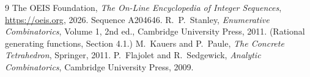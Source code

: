 \documentclass[11pt,a4paper]{article}
\theoremstyle{plain}
\theoremstyle{definition}
\begin{document}
\begin{thebibliography}{9}
 The OEIS Foundation, \emph{The On-Line Encyclopedia of Integer
Sequences}, \url{https://oeis.org}, 2026. Sequence A204646.
 R.~P.~Stanley, \emph{Enumerative Combinatorics}, Volume 1, 2nd ed.,
Cambridge University Press, 2011. (Rational generating functions, Section 4.1.)
 M.~Kauers and P.~Paule, \emph{The Concrete Tetrahedron}, Springer, 2011.
 P.~Flajolet and R.~Sedgewick, \emph{Analytic Combinatorics}, Cambridge
University Press, 2009.
\end{thebibliography}
\end{document}
